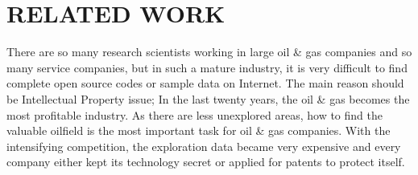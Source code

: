 %
%
%

\chapter{\uppercase{Related work}}
There are so many research scientists working in large oil \& gas companies and so many service companies, but in such a mature industry, it is very difficult to find complete open source codes or sample data on Internet. The main reason should be Intellectual Property issue; In the last twenty years, the oil \& gas becomes the most profitable industry. As there are less unexplored areas, how to find the valuable oilfield is the most important task for oil \& gas companies. With the intensifying competition, the exploration data became very expensive and every company either kept its technology secret or applied for patents to protect itself.    

